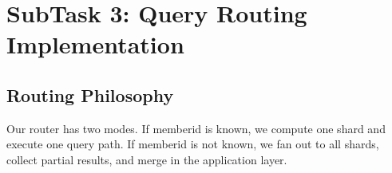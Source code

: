 \documentclass[a4paper,12pt]{article}
\begin{document}
\newpage
\section{SubTask 3: Query Routing Implementation}
\label{sec:subtask3}

\subsection{Routing Philosophy}

\begin{tcolorbox}[insightbox]
Our router has two modes. If memberid is known, we compute one shard and execute one query path. If memberid is not known, we fan out to all shards, collect partial results, and merge in the application layer.
\end{tcolorbox}

\end{document}

